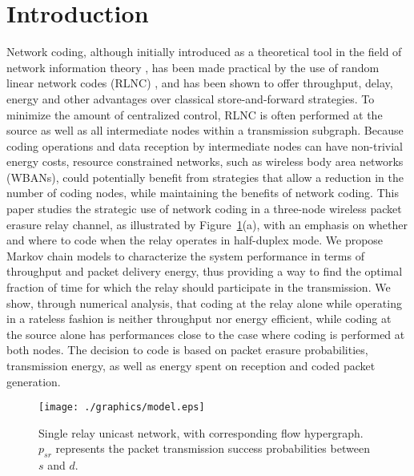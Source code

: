 \documentclass[journal, letterpaper]{IEEEtran}
\begin{document}
\section{Introduction}\label{sec:introduction}
Network coding, although initially introduced as a theoretical tool in the field of network information theory \cite{ahlswede2000network}, has been made practical by the use of random linear network codes (RLNC) \cite{chou2003practical, ho2006random}, and has been shown to offer throughput, delay, energy and other advantages over classical store-and-forward strategies. To minimize the amount of centralized control, RLNC is often performed at the source as well as all intermediate nodes within a transmission subgraph. Because coding operations and data reception by intermediate nodes can have non-trivial energy costs, resource constrained networks, such as wireless body area networks (WBANs), could potentially benefit from strategies that allow a reduction in the number of coding nodes, while maintaining the benefits of network coding. This paper studies the strategic use of network coding in a three-node wireless packet erasure relay channel, as illustrated by Figure~\ref{fig:model}(a), with an emphasis on whether and where to code when the relay operates in half-duplex mode. We propose Markov chain models to characterize the system performance in terms of throughput and packet delivery energy, thus providing a way to find the optimal fraction of time for which the relay should participate in the transmission. We show, through numerical analysis, that coding at the relay alone while operating in a rateless fashion is neither throughput nor energy efficient, while coding at the source alone has performances close to the case where coding is performed at both nodes. The decision to code is based on packet erasure probabilities, transmission energy, as well as energy spent on reception and coded packet generation.
\begin{figure}[t!]
  \centering
  \texttt{[image: ./graphics/model.eps]}
  \caption{Single relay unicast network, with corresponding flow hypergraph. $p_{sr}$ represents the packet transmission success probabilities between $s$ and $d$.}
  \label{fig:model}
\end{figure}
\end{document}
